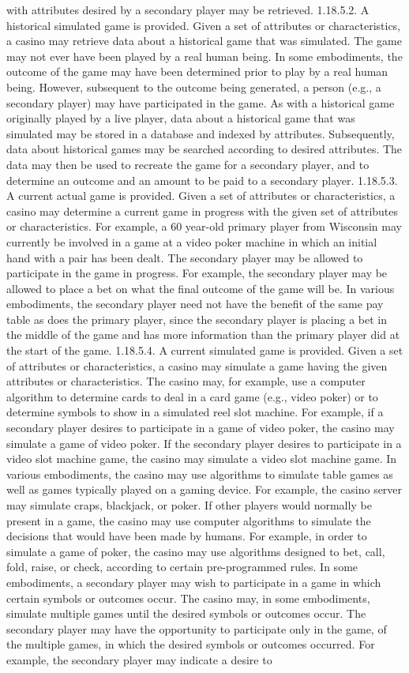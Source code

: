 \documentclass[11pt,a4paper]{article}
\begin{document}
with attributes desired by a secondary player may be retrieved. 1.18.5.2. A historical simulated game is provided. Given a set of attributes or characteristics, a casino may retrieve data about a historical game that was simulated. The game may not ever have been played by a real human being. In some embodiments, the outcome of the game may have been determined prior to play by a real human being. However, subsequent to the outcome being generated, a person (e.g., a secondary player) may have participated in the game. As with a historical game originally played by a live player, data about a historical game that was simulated may be stored in a database and indexed by attributes. Subsequently, data about historical games may be searched according to desired attributes. The data may then be used to recreate the game for a secondary player, and to determine an outcome and an amount to be paid to a secondary player. 1.18.5.3. A current actual game is provided. Given a set of attributes or characteristics, a casino may determine a current game in progress with the given set of attributes or characteristics. For example, a 60 year-old primary player from Wisconsin may currently be involved in a game at a video poker machine in which an initial hand with a pair has been dealt. The secondary player may be allowed to participate in the game in progress. For example, the secondary player may be allowed to place a bet on what the final outcome of the game will be. In various embodiments, the secondary player need not have the benefit of the same pay table as does the primary player, since the secondary player is placing a bet in the middle of the game and has more information than the primary player did at the start of the game. 1.18.5.4. A current simulated game is provided. Given a set of attributes or characteristics, a casino may simulate a game having the given attributes or characteristics. The casino may, for example, use a computer algorithm to determine cards to deal in a card game (e.g., video poker) or to determine symbols to show in a simulated reel slot machine. For example, if a secondary player desires to participate in a game of video poker, the casino may simulate a game of video poker. If the secondary player desires to participate in a video slot machine game, the casino may simulate a video slot machine game. In various embodiments, the casino may use algorithms to simulate table games as well as games typically played on a gaming device. For example, the casino server may simulate craps, blackjack, or poker. If other players would normally be present in a game, the casino may use computer algorithms to simulate the decisions that would have been made by humans. For example, in order to simulate a game of poker, the casino may use algorithms designed to bet, call, fold, raise, or check, according to certain pre-programmed rules. In some embodiments, a secondary player may wish to participate in a game in which certain symbols or outcomes occur. The casino may, in some embodiments, simulate multiple games until the desired symbols or outcomes occur. The secondary player may have the opportunity to participate only in the game, of the multiple games, in which the desired symbols or outcomes occurred. For example, the secondary player may indicate a desire to 
\end{document}
